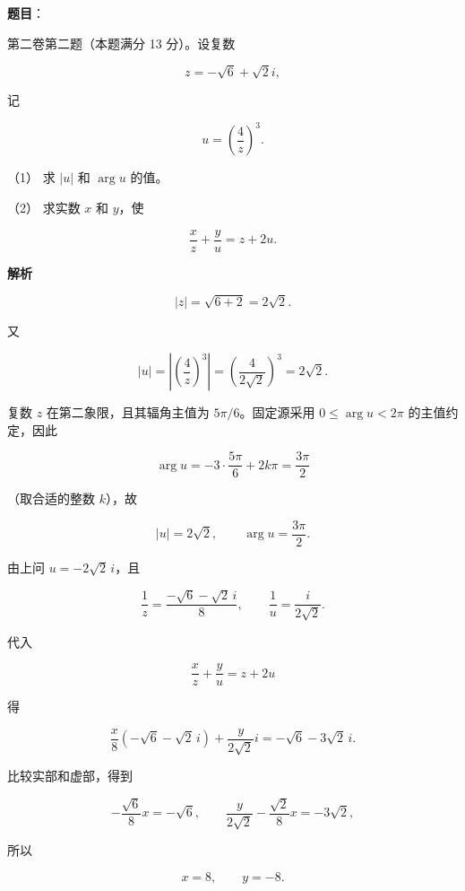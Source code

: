 \begin{answer}

\textbf{题目}：

第二卷第二题（本题满分 13 分）。设复数

\nopagebreak[4]
\[
z=-\sqrt6+\sqrt2i,
\]

记

\nopagebreak[4]
\[
u=\left(\frac4z\right)^3.
\]

（1） 求 $|u|$ 和 $\arg u$ 的值。

（2） 求实数 $x$ 和 $y$，使

\nopagebreak[4]
\[
\frac{x}{z}+\frac{y}{u}=z+2u.
\]

\textbf{解析}


\nopagebreak[4]
\[
|z|=\sqrt{6+2}=2\sqrt2.
\]

又

\nopagebreak[4]
\[
|u|=\left|\left(\frac4z\right)^3\right|
=\left(\frac4{2\sqrt2}\right)^3
=2\sqrt2.
\]

复数 $z$ 在第二象限，且其辐角主值为 $5\pi/6$。固定源采用 $0\le\arg u<2\pi$ 的主值约定，因此

\nopagebreak[4]
\[
\arg u=-3\cdot\frac{5\pi}{6}+2k\pi=\frac{3\pi}{2}
\]

（取合适的整数 $k$），故

\nopagebreak[4]
\[
|u|=2\sqrt2,\qquad \arg u=\frac{3\pi}{2}.
\]


由上问 $u=-2\sqrt2\,i$，且

\nopagebreak[4]
\[
\frac1z=\frac{-\sqrt6-\sqrt2\,i}{8},
\qquad
\frac1u=\frac{i}{2\sqrt2}.
\]

代入

\nopagebreak[4]
\[
\frac{x}{z}+\frac{y}{u}=z+2u
\]

得

\nopagebreak[4]
\[
\frac{x}{8}(-\sqrt6-\sqrt2\,i)
+\frac{y}{2\sqrt2}i
=-\sqrt6-3\sqrt2\,i.
\]

比较实部和虚部，得到

\nopagebreak[4]
\[
-\frac{\sqrt6}{8}x=-\sqrt6,\qquad
\frac{y}{2\sqrt2}-\frac{\sqrt2}{8}x=-3\sqrt2,
\]

所以

\nopagebreak[4]
\[
x=8,\qquad y=-8.
\]



\end{answer}
